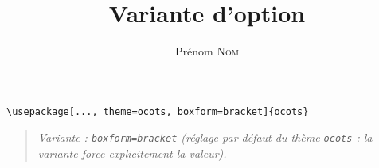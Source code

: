\documentclass[11pt]{ocots-book}
\title{Variante d'option}
\author{Prénom \textsc{Nom}}
\newcommand{\ocotsvariantnote}[1]{\begin{quote}\itshape Variante : #1\end{quote}}
\begin{document}
\maketitle

\begin{lstlisting}
\usepackage[..., theme=ocots, boxform=bracket]{ocots}
\end{lstlisting}
\ocotsvariantnote{\texttt{boxform=bracket} (r\'eglage par d\'efaut du th\`eme \texttt{ocots} : la variante force explicitement la valeur).}

\end{document}
